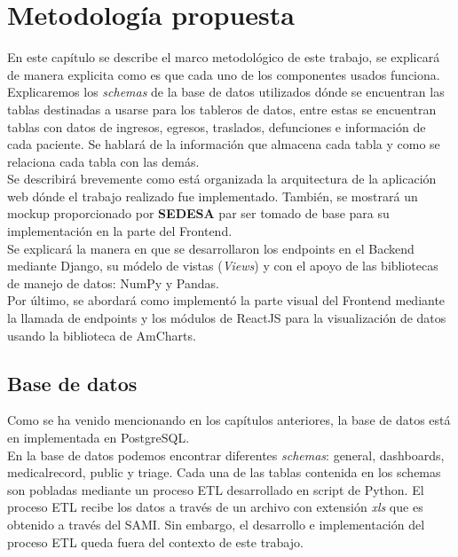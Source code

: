 \chapter{Metodología propuesta}\label{cap:propuesta}

En este capítulo se describe el marco metodológico de este trabajo, se explicará de manera explicita como es que cada uno de los componentes usados funciona.\\

Explicaremos los \textit{schemas} de la base de datos utilizados dónde se encuentran las tablas destinadas a usarse para los tableros de datos, entre estas se encuentran tablas con datos de ingresos, egresos, traslados, defunciones e información de cada paciente. Se hablará de la información que almacena cada tabla y como se relaciona cada tabla con las demás.\\

Se describirá brevemente como está organizada la arquitectura de la aplicación web dónde el trabajo realizado fue implementado. También, se mostrará un mockup proporcionado por \textbf{SEDESA} par ser tomado de base para su implementación en la parte del Frontend.\\

Se explicará la manera en que se desarrollaron los endpoints en el Backend mediante Django, su módelo de vistas (\textit{Views}) y con el apoyo de las bibliotecas de manejo de datos: NumPy y Pandas.\\

Por último, se abordará como implementó la parte visual del Frontend mediante la llamada de endpoints y los módulos de ReactJS para la visualización de datos usando la biblioteca de AmCharts.



\section{Base de datos}\label{sec:bd}

Como se ha venido mencionando en los capítulos anteriores, la base de datos está en implementada en PostgreSQL.\\
En la base de datos podemos encontrar diferentes \textit{schemas}: general, dashboards, medicalrecord, public y triage. Cada una de las tablas contenida en los schemas son pobladas mediante un proceso ETL desarrollado en script de Python. El proceso ETL recibe los datos a través de un archivo con extensión \textit{xls} que es obtenido a través del SAMI. Sin embargo, el desarrollo e implementación del proceso ETL queda fuera del contexto de este trabajo.\\

